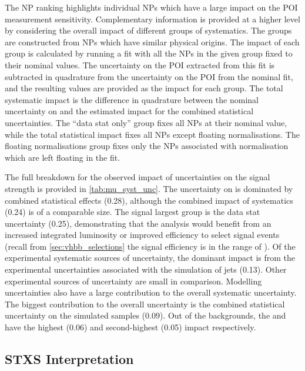 The NP ranking highlights individual NPs which have a large impact on the POI measurement sensitivity.
Complementary information is provided at a higher level by considering the overall impact of different groups of systematics.
The groups are constructed from NPs which have similar physical origins.
The impact of each group is calculated by running a fit with all the NPs in the given group fixed to their nominal values.
The uncertainty on the POI extracted from this fit is subtracted in quadrature from the uncertainty on the POI from the nominal fit, and the resulting values are provided as the impact for each group.
The total systematic impact is the difference in quadrature between the nominal uncertainty on \muVH and the estimated impact for the combined statistical uncertainties.
The ``data stat only'' group fixes all NPs at their nominal value, while the total statistical impact fixes all NPs except floating normalisations.
The floating normalisations group fixes only the NPs associated with normalisation which are left floating in the fit.

The full breakdown for the observed impact of uncertainties on the \muVH signal strength is provided in \cref{tab:mu_syst_unc}.
The uncertainty on \muVH is dominated by combined statistical effects (0.28), although the combined impact of systematics (0.24) is of a comparable size.
The signal largest group is the data stat uncertainty (0.25), demonstrating that the analysis would benefit from an increased integrated luminosity or improved efficiency to select signal events (recall from \cref{sec:vhbb_selections} the signal efficiency is in the range of ).
Of the experimental systematic sources of uncertainty, the dominant impact is from the experimental uncertainties associated with the simulation of \largeR jets (0.13).
Other experimental sources of uncertainty are small in comparison.
Modelling uncertainties also have a large contribution to the overall systematic uncertainty.
The biggest contribution to the overall uncertainty is the combined statistical uncertainty on the simulated samples (0.09).
Out of the backgrounds, the \Wjets and \Zjets have the highest (0.06) and second-highest (0.05) impact respectively.



\subsection{STXS Interpretation}\label{sec:stxs}

